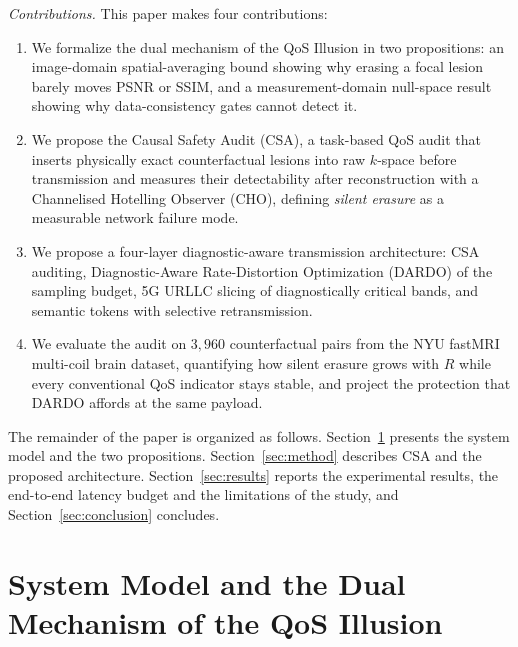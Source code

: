 \documentclass[conference]{IEEEtran}
\begin{document}
\textit{Contributions.} This paper makes four contributions:
\begin{enumerate}
    \item We formalize the dual mechanism of the QoS Illusion in two propositions: an image-domain spatial-averaging bound showing why erasing a focal lesion barely moves PSNR or SSIM, and a measurement-domain null-space result showing why data-consistency gates cannot detect it.
    \item We propose the Causal Safety Audit (CSA), a task-based QoS audit that inserts physically exact counterfactual lesions into raw $k$-space before transmission and measures their detectability after reconstruction with a Channelised Hotelling Observer (CHO), defining \emph{silent erasure} as a measurable network failure mode.
    \item We propose a four-layer diagnostic-aware transmission architecture: CSA auditing, Diagnostic-Aware Rate-Distortion Optimization (DARDO) of the sampling budget, 5G URLLC slicing of diagnostically critical bands, and semantic tokens with selective retransmission.
    \item We evaluate the audit on $3{,}960$ counterfactual pairs from the NYU fastMRI multi-coil brain dataset, quantifying how silent erasure grows with $R$ while every conventional QoS indicator stays stable, and project the protection that DARDO affords at the same payload.
\end{enumerate}

The remainder of the paper is organized as follows. Section~\ref{sec:theory} presents the system model and the two propositions. Section~\ref{sec:method} describes CSA and the proposed architecture. Section~\ref{sec:results} reports the experimental results, the end-to-end latency budget and the limitations of the study, and Section~\ref{sec:conclusion} concludes.

\section{System Model and the Dual Mechanism of the QoS Illusion}
\label{sec:theory}
\end{document}
